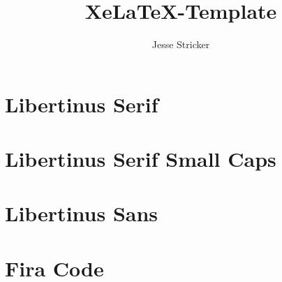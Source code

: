 \documentclass[ngerman]{scrartcl}
\title{XeLaTeX-Template}
\author{Jesse Stricker}
\date{\printdate{2019-05-17}}
\begin{document}
\maketitle

\begin{abstract}
    \lipsum[1][1-6]
\end{abstract}

\tableofcontents


\section{Libertinus Serif}
{\rmfamily\blindtext}

\section{Libertinus Serif Small Caps}
\textsc{\blindtext}

\section{Libertinus Sans}
{\sffamily\blindtext}

\section{Fira Code}
{\ttfamily\blindtext}
\end{document}
